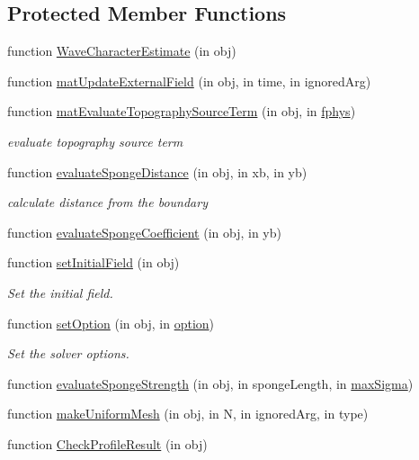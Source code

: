 \subsection*{Protected Member Functions}
\begin{DoxyCompactItemize}
\item 
function \hyperlink{class_wave_transform_over_an_elliptical_shoal_a39bfcfcf4d5ef203a35df4cf9a5087f5}{Wave\+Character\+Estimate} (in obj)
\item 
function \hyperlink{class_wave_transform_over_an_elliptical_shoal_ac3799091d4d63f99becde5499b6ce3ea}{mat\+Update\+External\+Field} (in obj, in time, in ignored\+Arg)
\item 
function \hyperlink{class_wave_transform_over_an_elliptical_shoal_a30af660bfeddbc9bf75f786d7ae7370a}{mat\+Evaluate\+Topography\+Source\+Term} (in obj, in \hyperlink{class_ndg_phys_a6b25724fc9474d32018439009072f0a9}{fphys})
\begin{DoxyCompactList}\small\item\em evaluate topography source term \end{DoxyCompactList}\item 
function \hyperlink{class_wave_transform_over_an_elliptical_shoal_aae4403ac906b5088b7d56fca9fbfd869}{evaluate\+Sponge\+Distance} (in obj, in xb, in yb)
\begin{DoxyCompactList}\small\item\em calculate distance from the boundary \end{DoxyCompactList}\item 
function \hyperlink{class_wave_transform_over_an_elliptical_shoal_a09c11bcbebeb4d8c5884fd65f6e06bd9}{evaluate\+Sponge\+Coefficient} (in obj, in yb)
\item 
function \hyperlink{class_wave_transform_over_an_elliptical_shoal_a8b549befe8e537dd283943815d732762}{set\+Initial\+Field} (in obj)
\begin{DoxyCompactList}\small\item\em Set the initial field. \end{DoxyCompactList}\item 
function \hyperlink{class_wave_transform_over_an_elliptical_shoal_aebb2df0387034c2d06e565f62dc5519b}{set\+Option} (in obj, in \hyperlink{class_ndg_phys_af91f4c54b93504e76b38a5693774dff1}{option})
\begin{DoxyCompactList}\small\item\em Set the solver options. \end{DoxyCompactList}\item 
function \hyperlink{class_wave_transform_over_an_elliptical_shoal_ab98b37bfa8f5d5bd3382c786ee57bae2}{evaluate\+Sponge\+Strength} (in obj, in sponge\+Length, in \hyperlink{class_wave_transform_over_an_elliptical_shoal_ab121078aee4b59e5cb011279059342ed}{max\+Sigma})
\item 
function \hyperlink{class_wave_transform_over_an_elliptical_shoal_a6958b4e88ea06de49044a27756d83014}{make\+Uniform\+Mesh} (in obj, in N, in ignored\+Arg, in type)
\item 
function \hyperlink{class_wave_transform_over_an_elliptical_shoal_ab048733d07597cfbb150bbb56923bf3a}{Check\+Profile\+Result} (in obj)
\end{DoxyCompactItemize}
